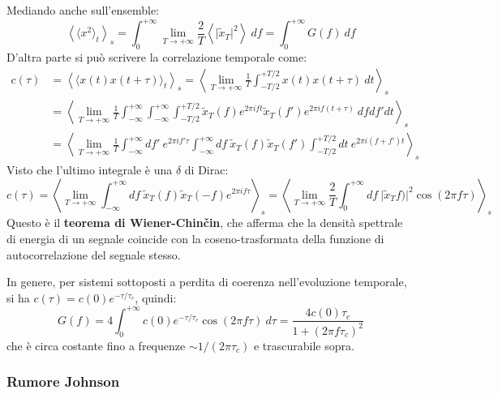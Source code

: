 \documentclass[10pt, a4paper]{scrartcl}
\numberwithin{equation}{subsection}
\theoremstyle{style1}
\begin{document}
Mediando anche sull'ensemble:
\[
\left\langle \langle x^2 \rangle_t \right\rangle_s = \int_{0} ^{+\infty} \lim_{T \to +\infty} \frac{2}{T} \left\langle \lvert \widetilde{x}_T \rvert ^2 \right\rangle \ df = \int_{0} ^{+\infty} G(f)  \ df
\] 
D'altra parte si pu\`o scrivere la correlazione temporale come:
\[
\begin{split}
	c(\tau ) &= \left\langle \langle x(t) x(t+\tau ) \rangle_t  \right\rangle_s = \left\langle \lim_{T \to +\infty} \frac{1}{T}\int_{-T / 2} ^{+ T / 2} x(t) x(t+\tau ) \ dt \right\rangle_s \\
		 &= \left\langle \lim_{T \to +\infty} \frac{1}{T}\int_{-\infty} ^{+\infty} \int_{-\infty} ^{+\infty} \int_{-T / 2} ^{+T / 2} \widetilde{x}_T (f) e ^{2\pi i ft} \widetilde{x}_T (f') e ^{2\pi i f (t+\tau )}  \ dfdf'dt \right\rangle_s\\
		 &= \left\langle \lim_{T \to +\infty} \frac{1}{T}\int_{-\infty} ^{+\infty} df ' \ e^{2 \pi i f' \tau } \int_{-\infty } ^{+\infty}df\ \widetilde{x}_T (f) \widetilde{x}_T (f') \int_{-T / 2} ^{+ T/2}  dt\ e^{2\pi i (f+f') t} \right\rangle_s
\end{split}
\] 
Visto che l'ultimo integrale \`e una $\delta $ di Dirac:
\begin{equation}
	c(\tau ) = \left\langle \lim_{T \to +\infty} \int_{-\infty} ^{+\infty} df\ \widetilde{x}_T (f) \widetilde{x}_T (-f) e^{2\pi i f \tau }  \right\rangle _s= \left\langle \lim_{T \to +\infty} \frac{2}{T}\int_{0} ^{+\infty} df \ \lvert \widetilde{x}_T f) \rvert ^2 \cos(2\pi f \tau ) \right\rangle_s
\end{equation}
Questo \`e il \textbf{teorema di Wiener-Chin\v cin}, che afferma che la densit\`a spettrale di energia di un segnale coincide con la coseno-trasformata della funzione di autocorrelazione del segnale stesso.

In genere, per sistemi sottoposti a perdita di coerenza nell'evoluzione temporale, si ha $c(\tau ) = c(0) e^{ - \tau  / \tau _c} $, quindi:
\begin{equation}
	G(f) = 4 \int_{0} ^{+\infty} c(0) e ^{- \tau  / \tau _c} \cos (2\pi f \tau ) \ d\tau = \frac{4 c(0) \tau _c}{1+ (2\pi f\tau _c)^2}
\end{equation}
che \`e circa costante fino a frequenze $\sim 1 / (2 \pi \tau _c)$ e trascurabile sopra.


\subsubsection{Rumore Johnson}
\end{document}
